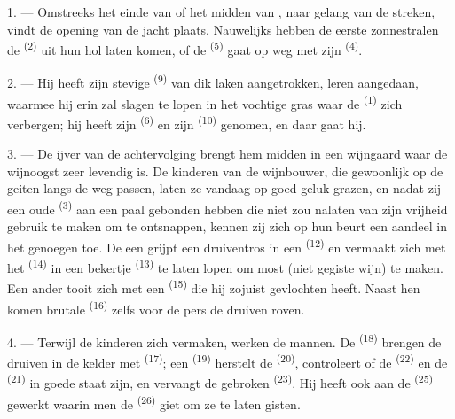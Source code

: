 \VUsaut{6.0mm}
\VUsaut{3.6mm}

\VUsaut{1.4mm}
\VUsaut{4.0mm}

1. --- Omstreeks het einde van  of het midden van
, naar gelang van de streken, vindt de opening van de jacht
plaats. Nauwelijks hebben de eerste zonnestralen de  \textsuperscript{(2)}
uit hun hol laten komen, of de  \textsuperscript{(5)} gaat op weg met zijn
 \textsuperscript{(4)}.

2. --- Hij heeft zijn stevige  \textsuperscript{(9)} van dik laken
aangetrokken, leren  aangedaan, waarmee hij erin zal slagen te lopen in het
vochtige gras waar de  \textsuperscript{(1)} zich verbergen; hij heeft zijn
 \textsuperscript{(6)} en zijn  \textsuperscript{(10)} genomen,
en daar gaat hij.

3. --- De ijver van de achtervolging brengt hem midden in een wijngaard waar de wijnoogst zeer
levendig is. De kinderen van de wijnbouwer, die gewoonlijk op de geiten langs de weg passen,
laten ze vandaag op goed geluk grazen, en nadat zij een oude 
\textsuperscript{(3)} aan een paal gebonden hebben die niet zou nalaten van zijn vrijheid
gebruik te maken om te ontsnappen, kennen zij zich op hun beurt een aandeel in het genoegen
toe. De een grijpt een druiventros in een  \textsuperscript{(12)} en
vermaakt zich met het
 \textsuperscript{(14)} in een bekertje \textsuperscript{(13)} te
laten lopen om most (niet gegiste wijn) te maken. Een ander tooit zich met een
 \textsuperscript{(15)} die hij zojuist gevlochten heeft.
Naast hen komen brutale  \textsuperscript{(16)} zelfs voor de pers de druiven
roven.

4. --- Terwijl de kinderen zich vermaken, werken de mannen. De
 \textsuperscript{(18)} brengen de druiven in de kelder met
 \textsuperscript{(17)}; een 
\textsuperscript{(19)} herstelt de  \textsuperscript{(20)}, controleert of de
 \textsuperscript{(22)} en de
 \textsuperscript{(21)} in goede staat zijn, en vervangt de
gebroken  \textsuperscript{(23)}. Hij heeft ook aan de
 \textsuperscript{(25)} gewerkt waarin men de 
\textsuperscript{(26)} giet om ze te laten gisten.

